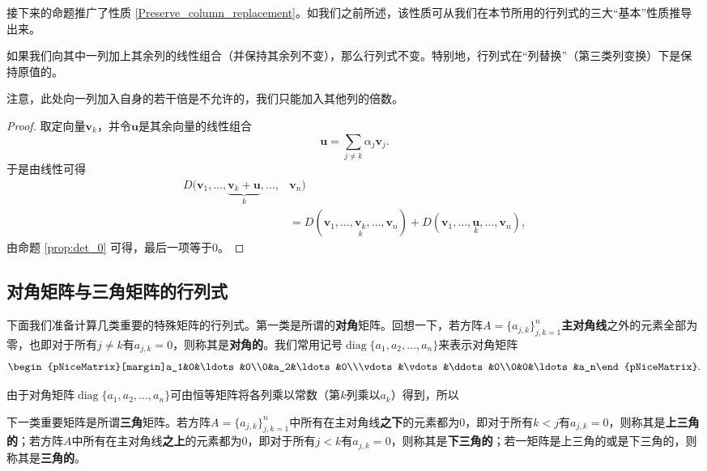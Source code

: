 接下来的命题推广了性质 \eqref{Preserve_column_replacement}。如我们之前所述，该性质可从我们在本节所用的行列式的三大“基本”性质推导出来。

\begin{proposition}
  如果我们向其中一列加上其余列的线性组合（并保持其余列不变），那么行列式不变。特别地，行列式在“列替换”（第三类列变换）下是保持原值的。
\end{proposition}

注意，此处向一列加入自身的若干倍是不允许的，我们只能加入其他列的倍数。

\begin{proof}
  取定向量$\mathbf{v}_k$，并令$\mathbf{u}$是其余向量的线性组合\[\mathbf{u}=\sum_{j\neq k}\alpha_j\mathbf{v}_j.\]
  于是由线性可得
  \begin{align*}
    D(\mathbf{v}_1,\ldots,\underbrace{\mathbf{v}_k+\mathbf{u}}_k,\ldots,&\mathbf{v}_n)\\
    &=D(\mathbf{v}_1,\ldots,\underset{k}{\mathbf{v}_k},\ldots,\mathbf{v}_n)+D(\mathbf{v}_1,\ldots,\underset{k}{\mathbf{u}},\ldots,\mathbf{v}_n),
  \end{align*}
  由命题 \ref{prop:det_0} 可得，最后一项等于$0$。
\end{proof}

\subsection{对角矩阵与三角矩阵的行列式}

下面我们准备计算几类重要的特殊矩阵的行列式。第一类是所谓的{\bf 对角}矩阵。回想一下，若方阵$A=\{a_{j,k}\}_{j,k=1}^{n}${\bf 主对角线}之外的元素全部为零，也即对于所有$j\ne k$有$a_{j,k}=0$，则称其是{\bf 对角的}。我们常用记号$\operatorname{diag}\{a_1,a_2,\dots,a_n\}$来表示对角矩阵\[\begin{pNiceMatrix}[margin]a_1&0&\ldots&0\\0&a_2&\ldots&0\\\vdots&\vdots&\ddots&0\\0&0&\ldots&a_n\end{pNiceMatrix}.\]

由于对角矩阵$\operatorname{diag}\{a_1,a_2,\dots,a_n\}$可由恒等矩阵将各列乘以常数（第$k$列乘以$a_k$）得到，所以
\begin{center}
\end{center}

下一类重要矩阵是所谓{\bf 三角}矩阵。若方阵$A=\{a_{j,k}\}_{j,k=1}^{n}$中所有在主对角线{\bf 之下}的元素都为$0$，即对于所有$k<j$有$a_{j,k}=0$，则称其是{\bf 上三角的}；若方阵$A$中所有在主对角线{\bf 之上}的元素都为$0$，即对于所有$j<k$有$a_{j,k}=0$，则称其是{\bf 下三角的}；若一矩阵是上三角的或是下三角的，则称其是{\bf 三角的}。

